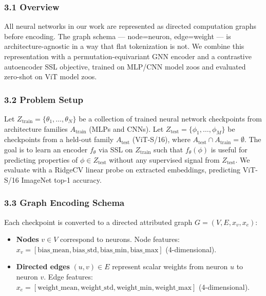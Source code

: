 
\subsubsection{3.1 Overview}

All neural networks in our work are represented as directed computation graphs before encoding. The graph schema --- node=neuron, edge=weight --- is architecture-agnostic in a way that flat tokenization is not. We combine this representation with a permutation-equivariant GNN encoder and a contrastive autoencoder SSL objective, trained on MLP/CNN model zoos and evaluated zero-shot on ViT model zoos.

\subsubsection{3.2 Problem Setup}

Let $Z_\text{train} = \{\theta_1, \ldots, \theta_N\}$ be a collection of trained neural network checkpoints from architecture families $A_\text{train}$ (MLPs and CNNs). Let $Z_\text{test} = \{\phi_1, \ldots, \phi_M\}$ be checkpoints from a held-out family $A_\text{test}$ (ViT-S/16), where $A_\text{test} \cap A_\text{train} = \emptyset$. The goal is to learn an encoder $f_\theta$ via SSL on $Z_\text{train}$ such that $f_\theta(\phi)$ is useful for predicting properties of $\phi \in Z_\text{test}$ without any supervised signal from $Z_\text{test}$. We evaluate with a RidgeCV linear probe on extracted embeddings, predicting ViT-S/16 ImageNet top-1 accuracy.

\subsubsection{3.3 Graph Encoding Schema}

Each checkpoint is converted to a directed attributed graph $G = (V, E, x_v, x_e)$:

\begin{itemize}
\item \textbf{Nodes} $v \in V$ correspond to neurons. Node features: $x_v = [\text{bias\_mean}, \text{bias\_std}, \text{bias\_min}, \text{bias\_max}]$ (4-dimensional).
\item \textbf{Directed edges} $(u, v) \in E$ represent scalar weights from neuron $u$ to neuron $v$. Edge features: $x_e = [\text{weight\_mean}, \text{weight\_std}, \text{weight\_min}, \text{weight\_max}]$ (4-dimensional).
\end{itemize}

